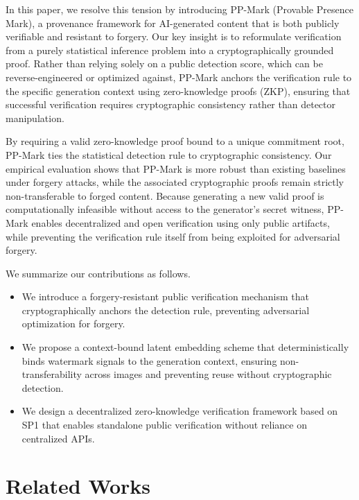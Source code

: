 \documentclass{article}
\theoremstyle{plain}
\theoremstyle{definition}
\theoremstyle{remark}
\begin{document}
In this paper, we resolve this tension by introducing PP-Mark (Provable Presence Mark), a provenance framework for AI-generated content that is both publicly verifiable and resistant to forgery. Our key insight is to reformulate verification from a purely statistical inference problem into a cryptographically grounded proof. Rather than relying solely on a public detection score, which can be reverse-engineered or optimized against, PP-Mark anchors the verification rule to the specific generation context using zero-knowledge proofs (ZKP), ensuring that successful verification requires cryptographic consistency rather than detector manipulation.

By requiring a valid zero-knowledge proof bound to a unique commitment root, PP-Mark ties the statistical detection rule to cryptographic consistency. Our empirical evaluation shows that PP-Mark is more robust than existing baselines under forgery attacks, while the associated cryptographic proofs remain strictly non-transferable to forged content. Because generating a new valid proof is computationally infeasible without access to the generator’s secret witness, PP-Mark enables decentralized and open verification using only public artifacts, while preventing the verification rule itself from being exploited for adversarial forgery.

We summarize our contributions as follows.
\begin{itemize}
    \item We introduce a forgery-resistant public verification mechanism that cryptographically anchors the detection rule, preventing adversarial optimization for forgery.
    \item We propose a context-bound latent embedding scheme that deterministically binds watermark signals to the generation context, ensuring non-transferability across images and preventing reuse without cryptographic detection.
    \item We design a decentralized zero-knowledge verification framework based on SP1 that enables standalone public verification without reliance on centralized APIs.
\end{itemize}
  
\section{Related Works} 
\end{document}
